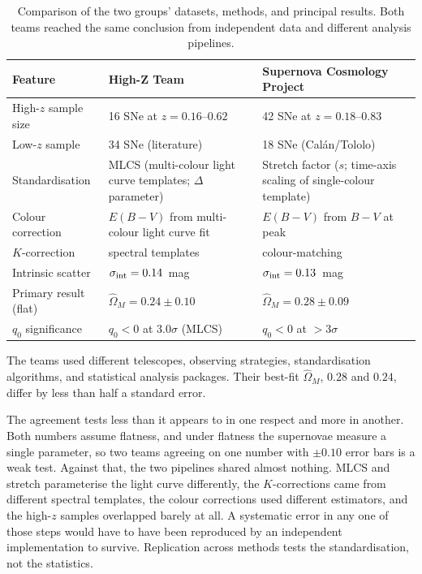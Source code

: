 \documentclass[12pt]{article}
\begin{document}
\begin{table}[ht]
\centering
\caption{Comparison of the two groups' datasets, methods, and
principal results.  Both teams reached the same conclusion from
independent data and different analysis pipelines.}
\label{tab:comparison_teams}
\medskip
\begin{tabular}{p{3.8cm}p{4.5cm}p{4.5cm}}
\toprule
Feature & High-Z Team \citep{Riess1998} &
  Supernova Cosmology Project \citep{Perlmutter1999} \\
\midrule
High-$z$ sample size & 16 SNe at $z = 0.16$--$0.62$ &
  42 SNe at $z = 0.18$--$0.83$ \\
Low-$z$ sample     & 34 SNe (literature) &
  18 SNe (Cal\'an/Tololo) \\
Standardisation    & MLCS (multi-colour light curve
  templates; $\Delta$ parameter) &
  Stretch factor ($s$; time-axis scaling of single-colour template) \\
Colour correction  & $E(B{-}V)$ from multi-colour
  light curve fit &
  $E(B{-}V)$ from $B{-}V$ at peak \\
$K$-correction    & \citet{Nugent2002} spectral templates &
  \citet{Kim1996} colour-matching \\
Intrinsic scatter  & $\sigma_{\rm int} = 0.14$~mag &
  $\sigma_{\rm int} = 0.13$~mag \\
Primary result (flat) & $\hat\Omega_M = 0.24 \pm 0.10$ &
  $\hat\Omega_M = 0.28 \pm 0.09$ \\
$q_0$ significance & $q_0<0$ at $3.0\sigma$ (MLCS) &
  $q_0<0$ at $>3\sigma$ \\
\bottomrule
\end{tabular}
\end{table}

The teams used different telescopes, observing strategies, standardisation
algorithms, and statistical analysis packages.  Their best-fit
$\hat\Omega_M$, $0.28$ and $0.24$, differ by less than half a standard error.

The agreement tests less than it appears to in one respect and more in
another.  Both numbers assume flatness, and under flatness the supernovae
measure a single parameter, so two teams agreeing on one number with
$\pm0.10$ error bars is a weak test.  Against that, the two pipelines shared
almost nothing.  MLCS and stretch parameterise the light curve differently,
the $K$-corrections came from different spectral templates, the colour
corrections used different estimators, and the high-$z$ samples overlapped
barely at all.  A systematic error in any one of those steps would have to
have been reproduced by an independent implementation to survive.  Replication
across methods tests the standardisation, not the statistics.
\end{document}
